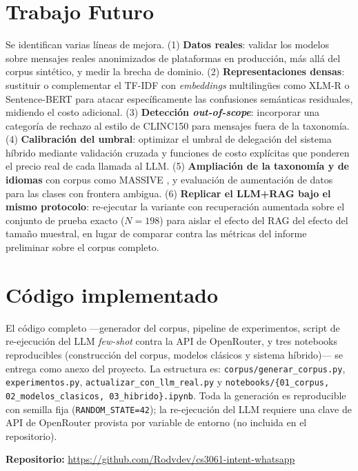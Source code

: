 \documentclass[journal]{IEEEtran}
\newcommand{\code}[1]{\texttt{\small #1}}
\begin{document}
\section{Trabajo Futuro}
Se identifican varias l\'ineas de mejora. (1) \textbf{Datos reales}: validar los
modelos sobre mensajes reales anonimizados de plataformas en producci\'on, m\'as
all\'a del corpus sint\'etico, y medir la brecha de dominio. (2)
\textbf{Representaciones densas}: sustituir o complementar el TF-IDF con
\emph{embeddings} multiling\"ues como XLM-R \cite{conneau2020xlmr} o
Sentence-BERT \cite{reimers2019sbert} para atacar espec\'ificamente las
confusiones sem\'anticas residuales, midiendo el costo adicional. (3)
\textbf{Detecci\'on \emph{out-of-scope}}: incorporar una categor\'ia de rechazo
al estilo de CLINC150 \cite{larson2019clinc} para mensajes fuera de la
taxonom\'ia. (4) \textbf{Calibraci\'on del umbral}: optimizar el umbral de
delegaci\'on del sistema h\'ibrido mediante validaci\'on cruzada y funciones de
costo expl\'icitas que ponderen el precio real de cada llamada al LLM. (5)
\textbf{Ampliaci\'on de la taxonom\'ia y de idiomas} con corpus como MASSIVE
\cite{fitzgerald2023massive}, y evaluaci\'on de aumentaci\'on de datos
\cite{wei2019eda} para las clases con frontera ambigua. (6) \textbf{Replicar el
LLM+RAG bajo el mismo protocolo}: re-ejecutar la variante con recuperaci\'on
aumentada sobre el conjunto de prueba exacto ($N=198$) para aislar el efecto
del RAG del efecto del tama\~no muestral, en lugar de comparar contra las
m\'etricas del informe preliminar sobre el corpus completo.

\section*{C\'odigo implementado}
El c\'odigo completo ---generador del corpus, pipeline de experimentos, script
de re-ejecuci\'on del LLM \emph{few-shot} contra la API de OpenRouter, y tres
notebooks reproducibles (construcci\'on del corpus, modelos cl\'asicos y sistema
h\'ibrido)--- se entrega como anexo del proyecto. La estructura es:
\code{corpus/generar\_corpus.py}, \code{experimentos.py},
\code{actualizar\_con\_llm\_real.py} y
\code{notebooks/\{01\_corpus, 02\_modelos\_clasicos, 03\_hibrido\}.ipynb}. Toda la
generaci\'on es reproducible con semilla fija (\code{RANDOM\_STATE=42}); la
re-ejecuci\'on del LLM requiere una clave de API de OpenRouter provista por
variable de entorno (no incluida en el repositorio).

\vspace{4pt}
\noindent\textbf{Repositorio:} \url{https://github.com/Rodvdev/cs3061-intent-whatsapp}



\end{document}
